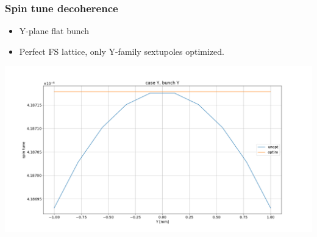\documentclass{beamer}
\begin{document}
\begin{frame}\frametitle{Spin tune decoherence}
  \begin{itemize}
  \item Y-plane flat bunch
  \item Perfect FS lattice, only Y-family sextupoles optimized.
  \end{itemize}
  \centering
  \includegraphics[width=\linewidth]{spin_tune_decoh_plot}
\end{frame}
\end{document}
